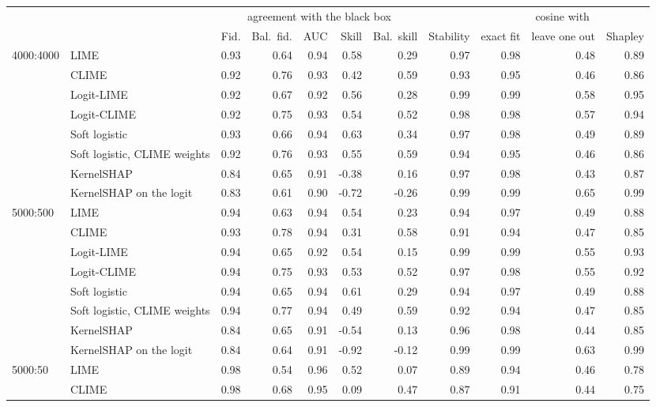 \begin{tabular}{@{}llrrrrrrrrr@{}}
  \toprule
   &  & \multicolumn{5}{c}{agreement with the black box} &  & \multicolumn{3}{c}{cosine with} \\
  \cmidrule(lr){3-7} \cmidrule(lr){9-11}
   &  & Fid. & Bal.\ fid. & AUC & Skill & Bal.\ skill & Stability & exact fit & leave one out & Shapley \\
  \midrule
  4000:4000 & LIME & 0.93 & 0.64 & 0.94 & 0.58 & 0.29 & 0.97 & 0.98 & 0.48 & 0.89 \\
   & CLIME & 0.92 & 0.76 & 0.93 & 0.42 & 0.59 & 0.93 & 0.95 & 0.46 & 0.86 \\
   & Logit-LIME & 0.92 & 0.67 & 0.92 & 0.56 & 0.28 & 0.99 & 0.99 & 0.58 & 0.95 \\
   & Logit-CLIME & 0.92 & 0.75 & 0.93 & 0.54 & 0.52 & 0.98 & 0.98 & 0.57 & 0.94 \\
   & Soft logistic & 0.93 & 0.66 & 0.94 & 0.63 & 0.34 & 0.97 & 0.98 & 0.49 & 0.89 \\
   & Soft logistic, CLIME weights & 0.92 & 0.76 & 0.93 & 0.55 & 0.59 & 0.94 & 0.95 & 0.46 & 0.86 \\
   & KernelSHAP & 0.84 & 0.65 & 0.91 & -0.38 & 0.16 & 0.97 & 0.98 & 0.43 & 0.87 \\
   & KernelSHAP on the logit & 0.83 & 0.61 & 0.90 & -0.72 & -0.26 & 0.99 & 0.99 & 0.65 & 0.99 \\
  \midrule
  5000:500 & LIME & 0.94 & 0.63 & 0.94 & 0.54 & 0.23 & 0.94 & 0.97 & 0.49 & 0.88 \\
   & CLIME & 0.93 & 0.78 & 0.94 & 0.31 & 0.58 & 0.91 & 0.94 & 0.47 & 0.85 \\
   & Logit-LIME & 0.94 & 0.65 & 0.92 & 0.54 & 0.15 & 0.99 & 0.99 & 0.55 & 0.93 \\
   & Logit-CLIME & 0.94 & 0.75 & 0.93 & 0.53 & 0.52 & 0.97 & 0.98 & 0.55 & 0.92 \\
   & Soft logistic & 0.94 & 0.65 & 0.94 & 0.61 & 0.29 & 0.94 & 0.97 & 0.49 & 0.88 \\
   & Soft logistic, CLIME weights & 0.94 & 0.77 & 0.94 & 0.49 & 0.59 & 0.92 & 0.94 & 0.47 & 0.85 \\
   & KernelSHAP & 0.84 & 0.65 & 0.91 & -0.54 & 0.13 & 0.96 & 0.98 & 0.44 & 0.85 \\
   & KernelSHAP on the logit & 0.84 & 0.64 & 0.91 & -0.92 & -0.12 & 0.99 & 0.99 & 0.63 & 0.99 \\
  \midrule
  5000:50 & LIME & 0.98 & 0.54 & 0.96 & 0.52 & 0.07 & 0.89 & 0.94 & 0.46 & 0.78 \\
   & CLIME & 0.98 & 0.68 & 0.95 & 0.09 & 0.47 & 0.87 & 0.91 & 0.44 & 0.75 \\

\end{tabular}
